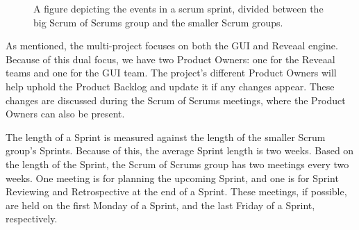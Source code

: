 \begin{figure}[H]
    \centering
    \caption{A figure depicting the events in a scrum sprint, divided between the big Scrum of Scrums group and the smaller Scrum groups.}
    \label{fig:scrum-of-scrums-events}
\end{figure}


As mentioned, the multi-project focuses on both the GUI and Reveaal engine.
Because of this dual focus, we have two Product Owners: one for the Reveaal teams and one for the GUI team.
The project's different Product Owners will help uphold the Product Backlog and update it if any changes appear. 
These changes are discussed during the Scrum of Scrums meetings, where the Product Owners can also be present.

The length of a Sprint is measured against the length of the smaller Scrum group's Sprints.
Because of this, the average Sprint length is two weeks.
Based on the length of the Sprint, the Scrum of Scrums group has two meetings every two weeks. 
One meeting is for planning the upcoming Sprint, and one is for Sprint Reviewing and Retrospective at the end of a Sprint.
These meetings, if possible, are held on the first Monday of a Sprint, and the last Friday of a Sprint, respectively.




